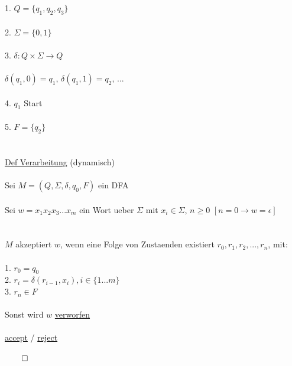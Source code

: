 \documentclass[18pt,a4paper]{scrreprt}
\newcommand{\tab}{\hspace*{2em}}
\begin{document}
\\
\\
1. $Q = \{q_1, q_2, q_3\}$\\
\\
2. $\Sigma = \{0,1\}$\\
\\
3. $\delta : Q \times \Sigma \rightarrow Q$\\
\\
\tab $\delta(q_1, 0) = q_1$, $\delta(q_1, 1) = q_2$, ...\\
\\
4. $q_1$ Start\\
\\
5. $F = \{q_2\}$\\
\\
\\
\uline{Def Verarbeitung} (dynamisch)\\
\\
Sei $M = (Q, \Sigma, \delta, q_0, F)$ ein DFA\\
\\
Sei $w = x_1x_2x_3...x_m$ ein Wort ueber $\Sigma$ mit $x_i \in \Sigma$, $n \geqslant 0$ $[n=0 \rightarrow w = \epsilon]$\\
\\
\\
$M$ akzeptiert $w$, wenn eine Folge von Zustaenden existiert $r_0, r_1, r_2, ... , r_n$, mit:\\
\\
1. $r_0 = q_0$\\
2. $r_i = \delta(r_{i-1}, x_i), i \in \{1...m\}$\\
3. $r_n \in F$\\
\\
Sonst wird $w$ \uline{verworfen}\\
\\
\uline{accept} / \uline{reject}\\
\\
$\qed$\\
\\
\end{document}
